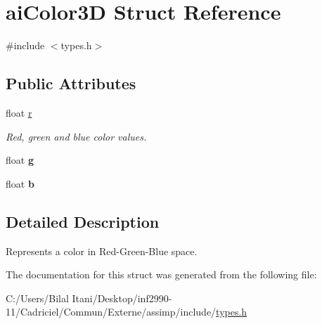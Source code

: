 \hypertarget{structai_color3_d}{}\section{ai\+Color3D Struct Reference}
\label{structai_color3_d}


{\ttfamily \#include $<$types.\+h$>$}

\subsection*{Public Attributes}
\begin{DoxyCompactItemize}
\item 
float \hyperlink{structai_color3_d_a0ff704458aa26c84bbfe93b2dd89c630}{r}\hypertarget{structai_color3_d_a0ff704458aa26c84bbfe93b2dd89c630}{}\label{structai_color3_d_a0ff704458aa26c84bbfe93b2dd89c630}

\begin{DoxyCompactList}\small\item\em Red, green and blue color values. \end{DoxyCompactList}\item 
float {\bfseries g}\hypertarget{structai_color3_d_a40ecdcee92b5373cbaa5e00ebcdb2cfb}{}\label{structai_color3_d_a40ecdcee92b5373cbaa5e00ebcdb2cfb}

\item 
float {\bfseries b}\hypertarget{structai_color3_d_a02ddcc7af11f7d4d6ea14f1bfb4ef6c7}{}\label{structai_color3_d_a02ddcc7af11f7d4d6ea14f1bfb4ef6c7}

\end{DoxyCompactItemize}


\subsection{Detailed Description}
Represents a color in Red-\/\+Green-\/\+Blue space. 

The documentation for this struct was generated from the following file\+:\begin{DoxyCompactItemize}
\item 
C\+:/\+Users/\+Bilal Itani/\+Desktop/inf2990-\/11/\+Cadriciel/\+Commun/\+Externe/assimp/include/\hyperlink{types_8h}{types.\+h}\end{DoxyCompactItemize}
